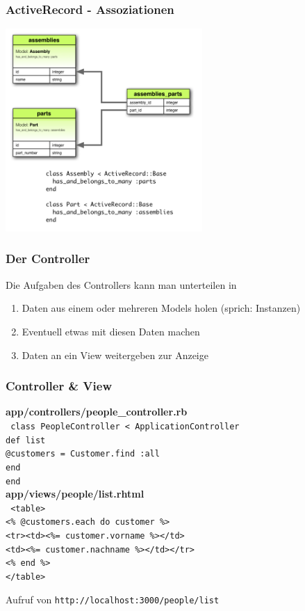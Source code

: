 \begin{frame}
  \frametitle{ActiveRecord - Assoziationen}
  \begin{center}
    \includegraphics[width=7.5cm]{img/habtm.png}
  \end{center}
\end{frame}

\begin{frame}
  \frametitle{Der Controller}
  Die Aufgaben des Controllers kann man unterteilen in
  \begin{enumerate}
    \item Daten aus einem oder mehreren Models holen (sprich: Instanzen)
    \item Eventuell etwas mit diesen Daten machen
    \item Daten an ein View weitergeben zur Anzeige
  \end{enumerate}
\end{frame}

\begin{frame}
  \frametitle{Controller \& View}
  {\bf \small app/controllers/people\_controller.rb}\\
  { \tt \small
    class {\color{red}People}Controller < ApplicationController \\
    \enskip def {\color{green}list} \\
    \enskip \enskip @customers = Customer.find :all \\
    \enskip end \\
    end \\
  }
  \vspace{0.3cm}
  {\small \bf app/views/people/list.rhtml} \\
  { \tt \small
    <table> \\
    \enskip <\% @customers.each do customer \%> \\
    \enskip \enskip <tr><td><\%= customer.vorname \%></td> \\
    \enskip \enskip \enskip <td><\%= customer.nachname \%></td></tr> \\
    \enskip <\% end \%> \\
    </table>
  }
  \begin{center}
    Aufruf von {\tt http://localhost:3000/{\color{red}people}/{\color{green}list}}
  \end{center}
\end{frame}

